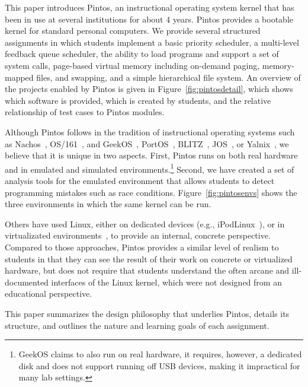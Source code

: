 This paper introduces Pintos, an instructional operating system kernel that 
has been in use at several institutions for about 4 years.  Pintos provides 
a bootable kernel for standard personal computers.  We provide several
structured assignments in which students implement a basic priority
scheduler, a multi-level feedback queue scheduler, the ability to
load programs and support a set of system calls, page-based virtual memory
including on-demand paging, memory-mapped files, and swapping, and a
simple hierarchical file system.  An overview of the projects enabled
by Pintos is given in Figure~\ref{fig:pintosdetail}, which shows which
software is provided, which is created by students, and the relative 
relationship of test cases to Pintos modules.

Although Pintos follows in the tradition of instructional operating systems 
such as Nachos~\cite{Christopher1993Nachos}, OS/161~\cite{Holland2002New}, and
GeekOS~\cite{Hovemeyer2004Running}, 
PortOS~\cite{Atkin2002PortOS},
BLITZ~\cite{PorterOverview},
JOS~\cite{1088822}, or Yalnix~\cite{1088822},
we believe that it is unique in two
aspects.  First, Pintos runs on both real hardware and in emulated and
simulated environments.\footnote{GeekOS claims to also run on real hardware, it requires,
however, a dedicated disk and does not support running off USB devices, making
it impractical for many lab settings.}
Second, we have created a set of analysis tools
for the emulated environment that allows students to detect programming
mistakes such as race conditions.  Figure~\ref{fig:pintosenvs} shows
the three environments in which the same kernel can be run.

Others have used Linux, either on dedicated devices (e.g., iPodLinux~\cite{1352199}),
or in virtualizated environments~\cite{1008027,1352648,Nieh2005Experiences}, to provide
an internal, concrete perspective.  Compared to those approaches, Pintos provides
a similar level of realism to students in that they can see the result of their
work on concrete or virtualized hardware, but does not require that students 
understand the often arcane and ill-documented interfaces of the Linux kernel,
which were not designed from an educational perspective.

This paper summarizes the design philosophy that underlies Pintos,
details its structure, and outlines the nature and learning goals of each
assignment.

\pintosenvfigure{}

\pintosdetailfigure{}



